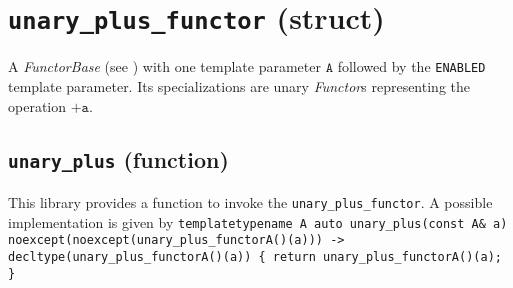 %
%
%
%
%
%
%

\section{\texttt{unary\_plus\_functor} (struct)}
A \textit{FunctorBase} (see \cite{functors}) with one template parameter $\texttt{A}$ followed by the \texttt{ENABLED} template parameter.
Its specializations are unary \textit{Functor}s representing the operation $\texttt{+a}$.

\subsection{\texttt{unary\_plus} (function)}
This library provides a function to invoke the \texttt{unary\_plus\_functor}.
A possible implementation is given by\newline
\texttt{template\textlangle typename A\textrangle\newline
auto\newline
unary\_plus(const A\& a)\newline
noexcept(noexcept(unary\_plus\_functor\textlangle A\textrangle()(a)))\newline
-> decltype(unary\_plus\_functor\textlangle A\textrangle()(a))\newline
\{ return unary\_plus\_functor\textlangle A\textrangle()(a); \}}

